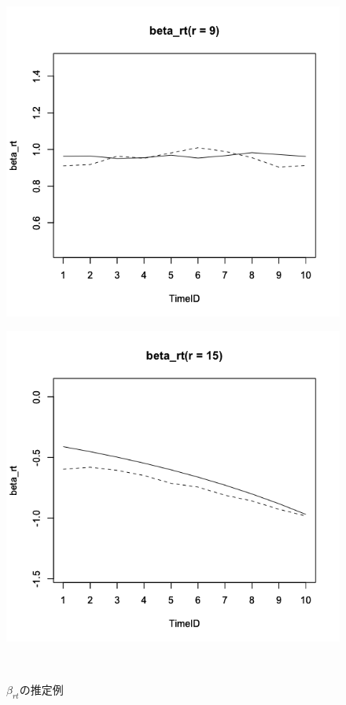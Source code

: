 \documentclass[a4paper,11pt,oneside,openany]{jsbook}
\begin{document}
\begin{figure}[]
\begin{minipage}[tb]{0.3\linewidth}
  \includegraphics[keepaspectratio,scale=0.25]{img/beta_rt_param_9.png}
  \label{ICC2}
 \end{minipage}
 \begin{minipage}[tb]{0.3\linewidth}
  \centering
  \includegraphics[keepaspectratio,scale=0.25]{img/beta_rt_param_15.png}
  \label{ICC3}
 \end{minipage}\\
 \caption{$\beta_{rt}$の推定例}\label{beta_rt_recovery}
\end{figure}
\end{document}
